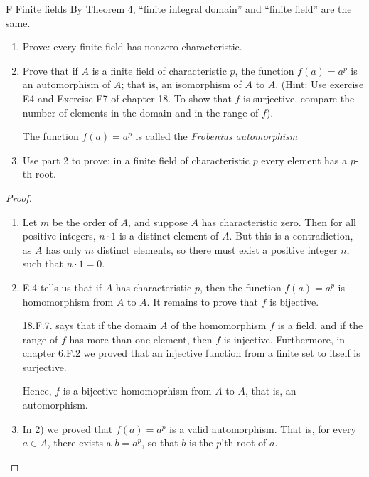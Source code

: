 \begin{exercise}{F Finite fields}
By Theorem 4, ``finite integral domain'' and ``finite field'' are the same.
  \begin{enumerate}
      \item  Prove: every finite field has nonzero characteristic.
      \item Prove that if $A$ is a finite field of characteristic $p$, the function $f(a)=a^{p}$ is an automorphism of $A$; that is, an isomorphism of $A$ to $A$. (Hint: Use exercise E4 and Exercise F7 of chapter 18. To show that $f$ is surjective, compare the number of elements in the domain and in the range of $f$). 
      
      The function $f(a)=a^{p}$ is called the \emph{Frobenius automorphism}
      \item Use part 2 to prove: in a finite field of characteristic $p$ every element has a $p$-th root.
  \end{enumerate}
\end{exercise}
\begin{proof}
 \begin{enumerate}
     \item Let $m$ be the order of $A$, and suppose $A$ has characteristic zero. Then for all positive integers, $n\cdot 1$ is a distinct element of $A$. But this is a contradiction, as $A$ has only $m$ distinct elements, so there must exist a positive integer $n$, such that $n\cdot 1=0$.
     \item E.4 tells us that if $A$ has characteristic $p$, then the function $f(a)=a^{p}$ is homomorphism from $A$ to $A$. It remains to prove that $f$ is bijective. 

     18.F.7. says that if the domain $A$ of the homomorphism $f$ is a field, and if the range of $f$ has more than one element, then $f$ is injective. Furthermore, in chapter 6.F.2 we proved that an injective function from a finite set to itself is surjective. 
     
     Hence, $f$ is a bijective homomoprhism from $A$ to $A$, that is, an automorphism.
     \item In 2) we proved that $f(a)=a^{p}$ is a valid automorphism. That is, for every $a\in A$, there exists a $b=a^{p}$, so that $b$ is the $p$'th root of $a$.
 \end{enumerate}
\end{proof}
